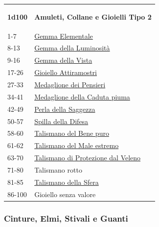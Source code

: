 \begin{multicols}{2}
{\medskip

{\small\begin{tabularx}{0.45\textwidth}{lX}\hypertarget{amuleticollanegioielli2}{}
\textbf{1d100} & \textbf{Amuleti, Collane e Gioielli Tipo 2}\\
1-7 & \hyperlink{GemmaElementale}{Gemma Elementale}\\
8-13& \hyperlink{GemmadellaLuminosità}{Gemma della Luminosità}\\
9-16& \hyperlink{GemmadellaVista}{Gemma della Vista}\\
17-26& \hyperlink{GioielloAttiramostri}{Gioiello Attiramostri}\\
27-33& \hyperlink{MedaglionedeiPensieri}{Medaglione dei Pensieri}\\
34-41& \hyperlink{MedaglionedellaCadutapiuma}{Medaglione della Caduta piuma}\\
42-49& \hyperlink{PerladellaSaggezza}{Perla della Saggezza}\\
50-57& \hyperlink{SpilladellaDifesa}{Spilla della Difesa}\\
58-60& \hyperlink{TalismanodelBenepuro}{Talismano del Bene puro}\\
61-62& \hyperlink{TalismanodelMaleestremo}{Talismano del Male estremo}\\
63-70& \hyperlink{Talismano di Protezione dal Veleno}{Talismano di Protezione dal Veleno}\\
71-80 & Talismano rotto\\
81-85& \hyperlink{TalismanodellaSfera}{Talismano della Sfera}\\
86-100& Gioiello senza valore
\end{tabularx}}

\subsubsection{Cinture, Elmi, Stivali e Guanti}\hypertarget{cintureelmi}{}\label{cintureelmi}

}
\end{multicols}
